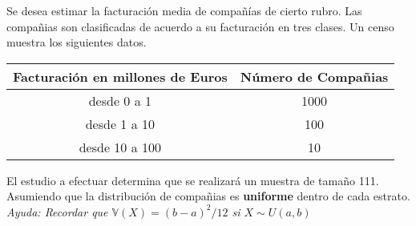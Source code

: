 \addpoints
\question[30] Se desea estimar la facturación media de compañías de cierto rubro. Las compañias son clasificadas de acuerdo a su facturación en tres clases. Un censo muestra los siguientes datos.


\begin{table}[h!]
\centering
\begin{tabular}{cc}
Facturación en millones de Euros & Número de Compañias \\ \hline
desde 0 a 1                      & 1000               \\
desde 1 a 10                     & 100                 \\
desde 10 a 100                   & 10                 
\end{tabular}
\end{table}
El estudio a efectuar determina que se realizará un muestra de tamaño 111. Asumiendo que la distribución de compañias es \textbf{uniforme} dentro de cada estrato.\\
\textit{Ayuda: Recordar que $\mathbb{V}(X)=(b-a)^2/12$ si $X\sim U(a,b)$}

\noaddpoints
{}

